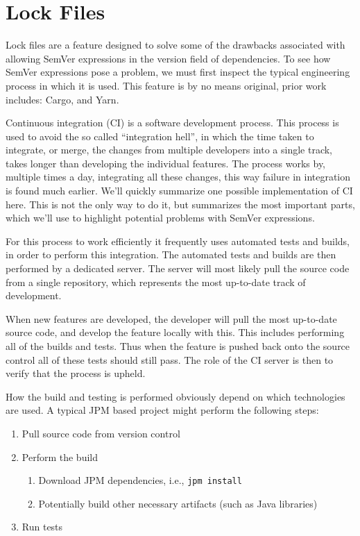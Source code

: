 \section{Lock Files}
\label{sec:lockfiles}


Lock files are a feature designed to solve some of the drawbacks associated
with allowing SemVer expressions in the version field of dependencies. To see
how SemVer expressions pose a problem, we must first inspect the typical
engineering process in which it is used. This feature is by no means original,
prior work includes: Cargo\autocite{CRAA}, and Yarn\autocite{YARNB}.

Continuous integration (CI) is a software development process\autocite{MFCI}.
This process is used to avoid the so called ``integration hell'', in which the
time taken to integrate, or merge, the changes from multiple developers into a
single track, takes longer than developing the individual features.  The
process works by, multiple times a day, integrating all these changes, this way
failure in integration is found much earlier. We'll quickly summarize one
possible implementation of CI here. This is not the only way to do it, but
summarizes the most important parts, which we'll use to highlight potential
problems with SemVer expressions.

For this process to work efficiently it frequently uses automated tests and
builds, in order to perform this integration. The automated tests and builds
are then performed by a dedicated server. The server will most likely pull the
source code from a single repository, which represents the most up-to-date
track of development.

When new features are developed, the developer will pull the most up-to-date
source code, and develop the feature locally with this. This includes
performing all of the builds and tests. Thus when the feature is pushed back
onto the source control all of these tests should still pass. The role of the
CI server is then to verify that the process is upheld.

How the build and testing is performed obviously depend on which technologies
are used. A typical JPM based project might perform the following steps:

\begin{enumerate}
\item Pull source code from version control
\item Perform the build
    \begin{enumerate}
        \item Download JPM dependencies, i.e., \verb!jpm install!
        \item Potentially build other necessary artifacts (such as Java
                libraries)
    \end{enumerate}
\item Run tests
\end{enumerate}

